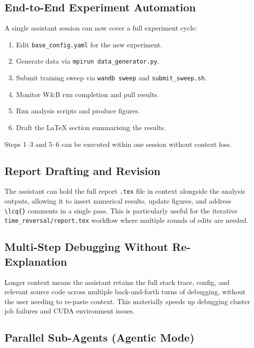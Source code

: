 \documentclass[11pt]{article}
\newcommand{\lcq}[1]{\textcolor{red}{#1}}
\begin{document}
\subsection{End-to-End Experiment Automation}

A single assistant session can now cover a full experiment cycle:
\begin{enumerate}[leftmargin=1.5em]
  \item Edit \texttt{base\_config.yaml} for the new experiment.
  \item Generate data via \texttt{mpirun data\_generator.py}.
  \item Submit training sweep via \texttt{wandb sweep} and
        \texttt{submit\_sweep.sh}.
  \item Monitor W\&B run completion and pull results.
  \item Run analysis scripts and produce figures.
  \item Draft the \LaTeX{} section summarising the results.
\end{enumerate}
Steps 1--3 and 5--6 can be executed within one session without
context loss.

\subsection{Report Drafting and Revision}

The assistant can hold the full report \texttt{.tex} file in context
alongside the analysis outputs, allowing it to insert numerical
results, update figures, and address \verb|\lcq{}| comments in a
single pass.  This is particularly useful for the iterative
\texttt{time\_reversal/report.tex} workflow where multiple rounds of
edits are needed.

\subsection{Multi-Step Debugging Without Re-Explanation}

Longer context means the assistant retains the full stack trace,
config, and relevant source code across multiple back-and-forth turns
of debugging, without the user needing to re-paste context.  This
materially speeds up debugging cluster job failures and CUDA
environment issues.

\subsection{Parallel Sub-Agents (Agentic Mode)}
\end{document}

